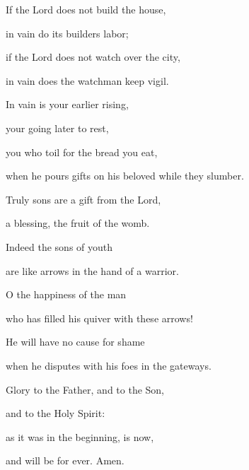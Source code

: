 \noindent If the Lord does not build the house, ~\GreStar{}~\nopagebreak

in vain do its builders labor;

\noindent if the Lord does not watch over the city, ~\GreStar{}~\nopagebreak

in vain does the watchman keep vigil.

\noindent In vain is your earlier rising, ~\GreStar{}~\nopagebreak

your going later to rest,

\noindent you who toil for the bread you eat, ~\GreStar{}~\nopagebreak

when he pours gifts on his beloved while they slumber.

\noindent Truly sons are a gift from the Lord, ~\GreStar{}~\nopagebreak

a blessing, the fruit of the womb.

\noindent Indeed the sons of youth ~\GreStar{}~\nopagebreak

are like arrows in the hand of a warrior.

\noindent O the happiness of the man ~\GreStar{}~\nopagebreak

who has filled his quiver with these arrows!

\noindent He will have no cause for shame ~\GreStar{}~\nopagebreak

when he disputes with his foes in the gateways. 

\noindent Glory to the Father, and to the Son,~\GreStar{}~\nopagebreak

and to the Holy Spirit:

\noindent as it was in the beginning, is now,~\GreStar{}~\nopagebreak

and will be for ever. Amen.
